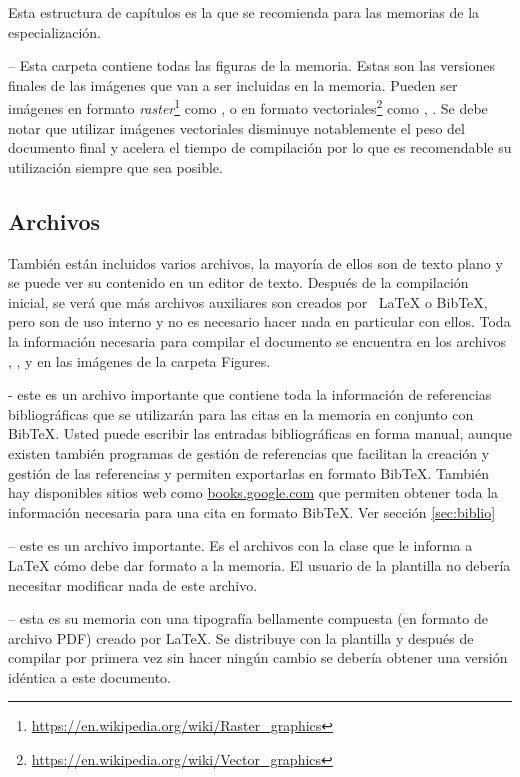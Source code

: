Esta estructura de capítulos es la que se recomienda para las memorias de la especialización.

 -- Esta carpeta contiene todas las figuras de la memoria.  Estas son las versiones finales de las imágenes que van a ser incluidas en la memoria.  Pueden ser imágenes en formato \textit{raster}\footnote{\url{https://en.wikipedia.org/wiki/Raster_graphics}} como ,  o en formato vectoriales\footnote{\url{https://en.wikipedia.org/wiki/Vector_graphics}} como , .  Se debe notar que utilizar imágenes vectoriales disminuye notablemente el peso del documento final y acelera el tiempo de compilación por lo que es recomendable su utilización siempre que sea posible.

\subsection{Archivos}

También están incluidos varios archivos, la mayoría de ellos son de texto plano y se puede ver su contenido en un editor de texto. Después de la compilación inicial, se verá que más archivos auxiliares son creados por \ LaTeX{} o BibTeX, pero son de uso interno y no es necesario hacer nada en particular con ellos.  Toda la información necesaria para compilar el documento se encuentra en los archivos , ,  y en las imágenes de la carpeta Figures.

 - este es un archivo importante que contiene toda la información de referencias bibliográficas que se utilizarán para las citas en la memoria en conjunto con BibTeX. Usted puede escribir las entradas bibliográficas en forma manual, aunque existen también programas de gestión de referencias que facilitan la creación y gestión de las referencias y permiten exportarlas en formato BibTeX.  También hay disponibles sitios web como \url{books.google.com} que permiten obtener toda la información necesaria para una cita en formato BibTeX. Ver sección \ref{sec:biblio}

 -- este es un archivo importante. Es el archivos con la clase que le informa a \LaTeX{} cómo debe dar formato a la memoria. El usuario de la plantilla no debería necesitar modificar nada de este archivo.

 -- esta es su memoria con una tipografía bellamente compuesta (en formato de archivo PDF) creado por \LaTeX{}. Se distribuye con la plantilla y después de compilar por primera vez sin hacer ningún cambio se debería obtener una versión idéntica a este documento.

